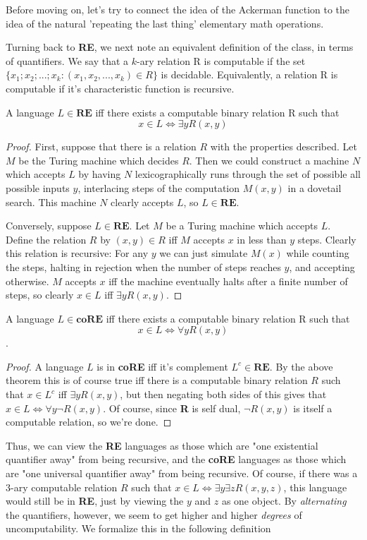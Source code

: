 Before moving on, let's try to connect the idea of the Ackerman function to the idea of the natural 'repeating the last thing' elementary math operations. 
\par Turning back to \textbf{RE}, we next note an equivalent definition of the class, in terms of quantifiers. We say that a $k$-ary relation R is computable if the set $\{x_1;x_2;...;x_k: (x_1,x_2,...,x_k) \in R\}$ is decidable. Equivalently, a relation R is computable if it's characteristic function is recursive.
\begin{theorem}
    A language $L \in \textbf{RE}$ iff there exists a computable binary relation R such that 
    \[ x \in L \iff \exists y R(x,y) \]
\end{theorem}
\begin{proof}
    First, suppose that there is a relation $R$ with the properties described. Let $M$ be the Turing machine which decides $R$. Then we could construct a machine $N$ which accepts $L$ by having $N$ lexicographically runs through the set of possible all possible inputs $y$, interlacing steps of the computation $M(x,y)$ in a dovetail search. This machine $N$ clearly accepts $L$, so $L \in \textbf{RE}$.
    \par Conversely, suppose $L \in \textbf{RE}$. Let $M$ be a Turing machine which accepts $L$. Define the relation $R$ by $(x,y) \in R$ iff $M$ accepts $x$ in less than $y$ steps. Clearly this relation is recursive: For any $y$ we can just simulate $M(x)$ while counting the steps, halting in rejection when the number of steps reaches $y$, and accepting otherwise. $M$ accepts $x$ iff the machine eventually halts after a finite number of steps, so clearly $x \in L$ iff $\exists y R(x,y)$.
\end{proof}
\begin{corollary}
    A language $L \in \textbf{coRE}$ iff there exists a computable binary relation R such that \[ x \in L \iff \forall y R(x,y) \].
\end{corollary}
\begin{proof}
    A language $L$ is in \textbf{coRE} iff it's complement $L^c \in \textbf{RE}$. By the above theorem this is of course true iff there is a computable binary relation $R$ such that $x \in L^c$ iff $\exists y R(x,y)$, but then negating both sides of this gives that $x \in L \iff \forall y \neg R(x,y)$. Of course, since \textbf{R} is self dual, $\neg R(x,y)$ is itself a computable relation, so we're done.
\end{proof}
Thus, we can view the \textbf{RE} languages as those which are "one existential quantifier away" from being recursive, and the \textbf{coRE} languages as those which are "one universal quantifier away" from being recursive. Of course, if there was a $3$-ary computable relation $R$ such that $x \in L \iff \exists y \exists z R(x,y,z)$, this language would still be in \textbf{RE}, just by viewing the $y$ and $z$ as one object. By \textit{alternating} the quantifiers, however, we seem to get higher and higher \textit{degrees} of uncomputability. We formalize this in the following definition
